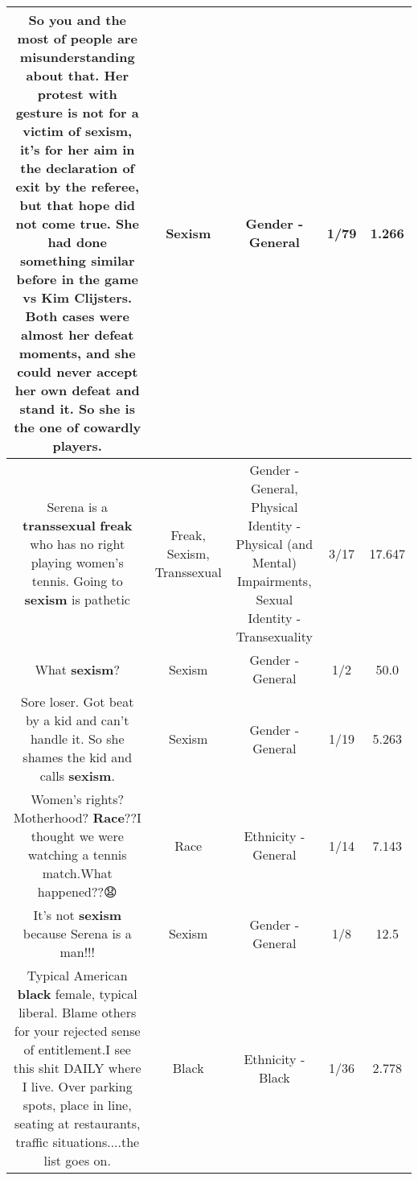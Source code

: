 \documentclass[11pt]{article}
\newlength\mylength
\begin{document}
\begin{center}
\begin{longtable}{|C{.65\mylength}|C{.30\mylength}|C{.12\mylength}|C{.12\mylength}|C{.12\mylength}|}
  \small So you and the most of people are misunderstanding about that.   Her protest with gesture is not for a victim of \textbf{sexism}, it's for her aim in the declaration of exit by the referee, but that hope did not come true.  She had done something similar before in the game vs Kim Clijsters.   Both cases were almost her defeat moments, and she could never accept her own defeat and stand it.  So she is the one of cowardly players.\normalsize   & Sexism & Gender - General & 1/79 & 1.266 \\  \hline
  \small Serena is a \textbf{transsexual} \textbf{freak} who has no right playing women's tennis. Going to \textbf{sexism} is pathetic\normalsize   & Freak, Sexism, Transsexual & Gender - General, Physical Identity - Physical (and Mental) Impairments, Sexual Identity - Transexuality & 3/17 & 17.647 \\  \hline
  \small What \textbf{sexism}?\normalsize   & Sexism & Gender - General & 1/2 & 50.0 \\  \hline
  \small Sore loser. Got beat by a kid and can't handle it. So she shames the kid and calls \textbf{sexism}.\normalsize   & Sexism & Gender - General & 1/19 & 5.263 \\  \hline
  \small Women's rights? Motherhood? \textbf{Race}??I thought we were watching a tennis match.What happened??😧\normalsize   & Race & Ethnicity - General & 1/14 & 7.143 \\  \hline
  \small It's not \textbf{sexism} because Serena is a man!!!\normalsize   & Sexism & Gender - General & 1/8 & 12.5 \\  \hline
  \small Typical American \textbf{black} female, typical liberal.  Blame others for your rejected sense of entitlement.I see this shit DAILY where I live.  Over parking spots, place in line, seating at restaurants, traffic situations....the list goes on.\normalsize   & Black & Ethnicity - Black & 1/36 & 2.778 \\  \hline

\end{longtable}
\end{center}
\end{document}
